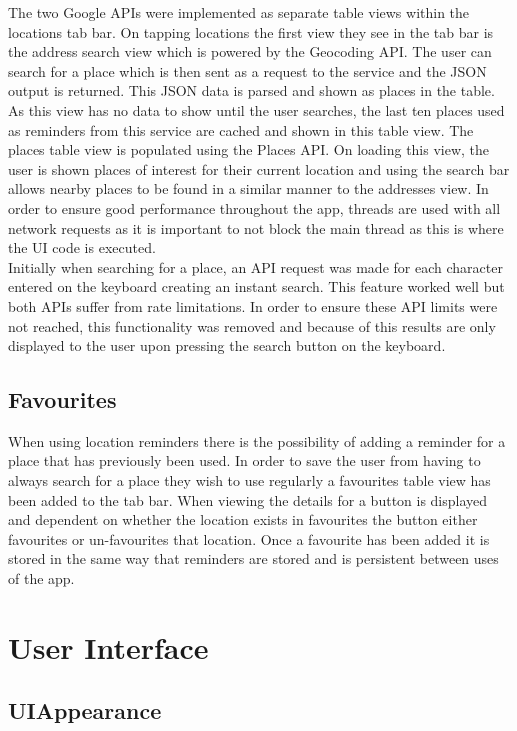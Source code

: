 \documentclass[12pt]{report}
\begin{document}
The two Google APIs were implemented as separate table views within the locations tab bar. On tapping locations the first view they see in the tab bar is the address search view which is powered by the Geocoding API. The user can search for a place which is then sent as a request to the service and the JSON output is returned. This JSON data is parsed and shown as places in the table. As this view has no data to show until the user searches, the last ten places used as reminders from this service are cached and shown in this table view. The places table view is populated using the Places API. On loading this view, the user is shown places of interest for their current location and using the search bar allows nearby places to be found in a similar manner to the addresses view. In order to ensure good performance throughout the app, threads are used with all network requests as it is important to not block the main thread as this is where the UI code is executed.\\

Initially when searching for a place, an API request was made for each character entered on the keyboard creating an instant search. This feature worked well but both APIs suffer from rate limitations. In order to ensure these API limits were not reached, this functionality was removed and because of this results are only displayed to the user upon pressing the search button on the keyboard.

\subsection{Favourites}
 
When using location reminders there is the possibility of adding a reminder for a place that has previously been used. In order to save the user from having to always search for a place they wish to use regularly a favourites table view has been added to the tab bar. When viewing the details for a button is displayed and dependent on whether the location exists in favourites the button either favourites or un-favourites that location. Once a favourite has been added it is stored in the same way that reminders are stored and is persistent between uses of the app.
 
\section{User Interface}

\subsection{UIAppearance}
\end{document}
